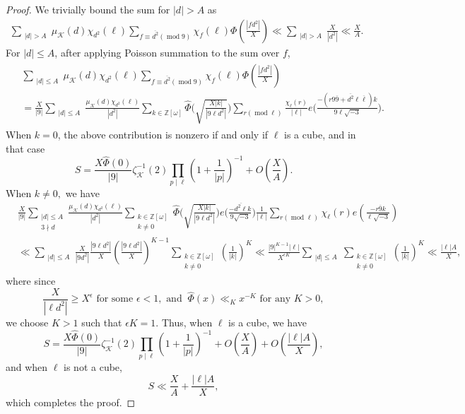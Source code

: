\documentclass[11pt]{amsart}
\numberwithin{equation}{section}
\newcommand{\mymod}[1]{(\operatorname{mod} #1)}
\theoremstyle{remark}
\begin{document}
\begin{proof}
We trivially bound the sum for $|d|>A$ as
\begin{align*}
    \sum_{\substack{|d|>A}}\mu_\mathcal{K}(d)\chi_{d^2}(\ell)
    \sum_{f \equiv \overline{d^2}\mymod9}\chi_{f}(\ell)\Phi\left(\frac{|fd^2|}{X}\right)
    \ll
    \sum_{\substack{|d|>A}}\frac{X}{|d^2|}
    \ll
    \frac{X}{A}.
\end{align*}
For $|d|\le A$, after applying Poisson summation to the sum over $f$,
\begin{align}
\begin{split}
    &\sum_{\substack{|d|\le A}}\mu_\mathcal{K}(d)\chi_{d^2}(\ell)
    \sum_{f \equiv \overline{d^2}\mymod9}\chi_{f}(\ell)\Phi\left(\frac{|fd^2|}{X}\right)
    \\
    &=
    \frac{X}{|9|}\sum_{\substack{|d|\le A}}\frac{\mu_\mathcal{K}(d)\chi_{d^2}(\ell)}{|d^2|}
    \sum_{k\in \mathbb{Z}[\omega]} \widehat{\Phi}\bigg(\sqrt{\frac{X|k|}{|9{\ell }d^2|}}\bigg)
    \sum_{r\mymod {\ell }} \frac{\chi_{\ell }(r)}{|\ell|}e\bigg(\frac{-( r9\overline{9}+\overline{d^2}\ell\overline{\ell})k}{{9\ell }\sqrt{-3}}\bigg).
\end{split}
\end{align}
When $k=0$, the above contribution is nonzero if and only if $\ell$ is a cube, and in that case
$$S=\frac{X\widehat{\Phi}(0)}{|9|}  \zeta^{-1}_\mathcal{K}(2)  \prod_{p\mid \ell}\left(1+\frac{1}{|p|}\right)^{-1} +O\left(\frac{X}{A}\right).$$
When $k\ne 0,$ we have
\begin{align*}
    &\frac{X}{|9|}\sum_{\substack{|d|\le A\\3\nmid d}}\frac{\mu_\mathcal{K}(d)\chi_{d^2}(\ell)}{|d^2|}
    \sum_{\substack{k\in \mathbb{Z}[\omega]\\k\ne 0}} \widehat{\Phi}\bigg(\sqrt{\frac{X|k|}{|9{\ell }d^2|}}\bigg)
    e\bigg(\frac{- \overline{d^2\ell}k}{{9 }\sqrt{-3}}\bigg)
    \frac{1}{|\ell|}\sum_{r\mymod {\ell }} \chi_{\ell }(r)e\left(\frac{- r\overline{9}k}{{\ell }\sqrt{-3}}\right)\\
    &\ll
    \sum_{\substack{|d|\le A}}\frac{X}{|9d^2|} \frac{|9\ell d^2|}{X} \left(\frac{|9\ell d^2|}{X}\right)^{K-1}
    \sum_{\substack{k\in \mathbb{Z}[\omega]\\k\ne 0}}
    \left(\frac{1}{|k|}\right)^K
    \ll
    \frac{|9|^{K-1}|\ell|}{X^{\epsilon K}}\sum_{\substack{|d|\le A}} 
    \sum_{\substack{k\in \mathbb{Z}[\omega]\\k\ne 0}}
    \left(\frac{1}{|k|}\right)^K\ll
    \frac{|\ell|A}{X},
\end{align*}
where since
$$\frac{X}{|\ell d^2|} \ge X^\epsilon \text{ for some } \epsilon<1, \text{ and } \  \widehat{\Phi}(x)\ll_K x^{-K} \text{ for any } K>0,$$
we choose $K>1$ such that $\epsilon K=1.$
Thus, when $\ell$ is a cube, we have 
$$S=\frac{X\widehat{\Phi}(0)}{|9|}  \zeta^{-1}_\mathcal{K}(2)  \prod_{p\mid \ell}\left(1+\frac{1}{|p|}\right)^{-1} +O\left(\frac{X}{A}\right)+O\left(\frac{|\ell|A}{X}\right),$$
and when $\ell$ is not a cube, 
$$S
\ll
\frac{X}{A}+\frac{|\ell|A}{X},$$
which completes the proof.
\end{proof}
\end{document}
